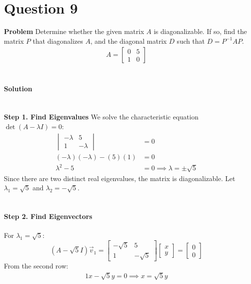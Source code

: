 \documentclass{article}
\begin{document}
\section{Question 9}
\textbf{Problem}
Determine whether the given matrix $A$ is diagonalizable. If so, find the matrix
$P$ that diagonalizes $A$, and the diagonal matrix $D$ such that $D = P^{-1}AP$.
\begin{align*}
    A = \begin{bmatrix}
        0 & 5 \\
        1 & 0
    \end{bmatrix}
\end{align*}
\\
\\
\textbf{Solution}
\\
\\
\\
\textbf{Step 1. Find Eigenvalues}
We solve the characteristic equation $\det(A - \lambda I) = 0$:
\begin{align*}
	\begin{vmatrix} -\lambda & 5 \\ 1 & -\lambda \end{vmatrix} & = 0                                \\
	(-\lambda)(-\lambda) - (5)(1)                              & = 0                                \\
	\lambda^{2} - 5                                            & = 0 \implies \lambda = \pm\sqrt{5}
\end{align*}
Since there are two distinct real eigenvalues, the matrix is diagonalizable.
Let $\lambda_{1} = \sqrt{5}$ and $\lambda_{2} = -\sqrt{5}$.
\\
\\
\\
\textbf{Step 2. Find Eigenvectors}
\\
\\
For $\lambda_{1} = \sqrt{5}$:
\[
	(A - \sqrt{5}I)\vec{v}_{1} = \begin{bmatrix} -\sqrt{5} & 5 \\ 1 & -\sqrt{5} \end{bmatrix} \begin{bmatrix} x \\ y \end{bmatrix} = \begin{bmatrix} 0 \\ 0 \end{bmatrix}
\]
From the second row:
\begin{align*}
	1x - \sqrt{5}y = 0 \implies x = \sqrt{5}y
\end{align*}
\end{document}

